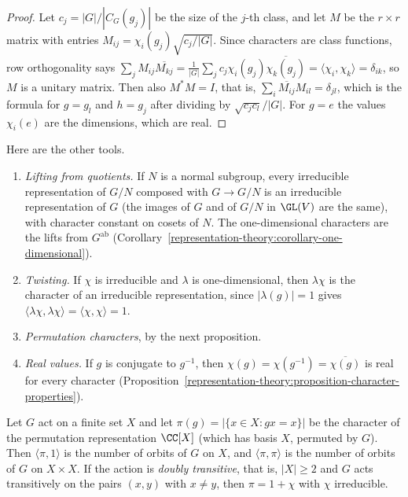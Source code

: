 \begin{proof}
Let $c_j = |G|/|C_G(g_j)|$ be the size of the $j$-th class, and let $M$ be the $r \times r$ matrix with entries $M_{ij} = \chi_i(g_j)\sqrt{c_j/|G|}$. Since characters are
class functions, row orthogonality says $\sum_jM_{ij}\overline{M_{kj}} = \frac{1}{|G|}\sum_jc_j\chi_i(g_j)\overline{\chi_k(g_j)} = \langle\chi_i, \chi_k\rangle = \delta_{ik}$, so $M$ is a unitary matrix.
Then also $M^*M = I$, that is, $\sum_i\overline{M_{ij}}M_{il} = \delta_{jl}$, which is the formula for $g = g_l$ and $h = g_j$ after dividing by $\sqrt{c_jc_l}/|G|$. For $g = e$ the
values $\chi_i(e)$ are the dimensions, which are real.
\end{proof}

Here are the other tools.
\begin{enumerate}
\item \emph{Lifting from quotients.} If $N$ is a normal subgroup, every irreducible representation of $G/N$ composed with $G \to G/N$ is an irreducible representation of $G$ (the
images of $G$ and of $G/N$ in $\GL(V)$ are the same), with character constant on cosets of $N$. The one-dimensional characters are the lifts from $G^{\mathrm{ab}}$
(Corollary~\ref{representation-theory:corollary-one-dimensional}).
\item \emph{Twisting.} If $\chi$ is irreducible and $\lambda$ is one-dimensional, then $\lambda\chi$ is the character of an irreducible representation, since
$|\lambda(g)| = 1$ gives $\langle\lambda\chi, \lambda\chi\rangle = \langle\chi, \chi\rangle = 1$.
\item \emph{Permutation characters}, by the next proposition.
\item \emph{Real values.} If $g$ is conjugate to $g^{-1}$, then $\chi(g) = \chi(g^{-1}) = \overline{\chi(g)}$ is real for every character
(Proposition~\ref{representation-theory:proposition-character-properties}).
\end{enumerate}

\begin{proposition}\label{representation-theory:proposition-permutation-character}
Let $G$ act on a finite set $X$ and let $\pi(g) = |\{x \in X : gx = x\}|$ be the character of the permutation representation $\CC[X]$ (which has basis $X$, permuted by
$G$). Then $\langle\pi, 1\rangle$ is the number of orbits of $G$ on $X$, and $\langle\pi, \pi\rangle$ is the number of orbits of $G$ on $X \times X$. If the action is
\emph{doubly transitive}, that is, $|X| \geq 2$ and $G$ acts transitively on the pairs $(x, y)$ with $x \neq y$, then $\pi = 1 + \chi$ with $\chi$ irreducible.
\end{proposition}

